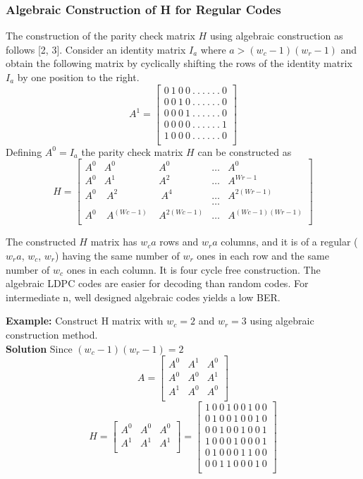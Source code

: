 \subsubsection{Algebraic Construction of H for Regular Codes}
The construction of the parity check matrix $H$ using algebraic construction as follows [2, 3]. Consider an identity matrix $I_a$ where $a > (w_c - 1)(w_r - 1)$ and obtain the following matrix by cyclically shifting the rows of the identity matrix $I_a$ by one position to the right.
\[A^1=\left[\begin{matrix}0\ 1\ 0\ 0\ .\ .\ .\ .\ .\ .\ 0\\0\ 0\ 1\ 0\ .\ .\ .\ .\ .\ .\ 0\\0\ 0\ 0\ 1\ .\ .\ .\ .\ .\ .\ 0\\0\ 0\ 0\ 0\ .\ .\ .\ .\ .\ .\ 1\\1\ 0\ 0\ 0\ .\ .\ .\ .\ .\ .\ 0\\\end{matrix}\right]\]
Defining $A^0 = I_a$ the parity check matrix $H$ can be constructed as
\[H=\left[\begin{matrix}A^0&A^0&A^0&\ldots&A^0\\A^0&A^{1\ \ }&A^2&\ldots&A^{Wr-1}\\A^0&\ A^{2\ }&\ A^4&\ldots&A^{2(Wr-1)}\\\ &\ &\ &\ldots&\ \\A^0&\ A^{\left(Wc-1\right)\ \ }&A^{2(Wc-1)}&\ldots&A^{(Wc-1)(Wr-1)}\\\end{matrix}\right]\]

The constructed $H$ matrix has $w_ca$ rows and $w_ra$ columns, and it is of a regular ($w_ra$, $w_c$, $w_r$) having the same number of $w_r$ ones in each row and the same number of $w_c$ ones in each column. It is four cycle free construction. The algebraic LDPC codes are easier for decoding than random codes. For intermediate n, well designed algebraic codes yields a low BER.

\textbf{Example:} Construct H matrix with $w_c = 2$ and $w_r = 3$ using algebraic construction method.\\
\textbf{Solution} Since $(w_c - 1)(w_r - 1) = 2$
\[A=\left[\begin{matrix}A^0&A^1&A^0\\A^0&A^0&A^1\\A^1&A^0&A^0\\\end{matrix}\right]\]
\[H=\left[\begin{matrix}A^0&A^0&A^0\\A^1&A^1&A^1\\\end{matrix}\right]=\left[\begin{matrix}1\ 0\ 0\ 1\ 0\ 0\ 1\ 0\ 0\\0\ 1\ 0\ 0\ 1\ 0\ 0\ 1\ 0\\0\ 0\ 1\ 0\ 0\ 1\ 0\ 0\ 1\\1\ 0\ 0\ 0\ 1\ 0\ 0\ 0\ 1\\0\ 1\ 0\ 0\ 0\ 1\ 1\ 0\ 0\\0\ 0\ 1\ 1\ 0\ 0\ 0\ 1\ 0\\\end{matrix}\right]\]

